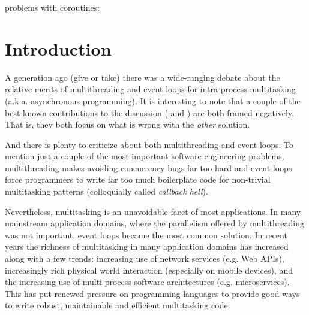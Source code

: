 \documentclass[a4paper,UKenglish,cleveref, autoref]{lipics-v2019}
\begin{document}









problems with coroutines:









\section{Introduction}

A generation ago (give or take) there was a wide-ranging debate about the relative merits of multithreading and event loops for intra-process multitasking (a.k.a. asynchronous programming).
It is interesting to note that a couple of the best-known contributions to the discussion (\cite{Ousterhout1996} and \cite{Behren2003a}) are both framed negatively.
That is, they both focus on what is wrong with the \emph{other} solution.

And there is plenty to criticize about both multithreading and event loops.
To mention just a couple of the most important software engineering problems, multithreading makes avoiding concurrency bugs far too hard \cite{Lu2008} and event loops force programmers to write far too much boilerplate code for non-trivial multitasking patterns \cite{Adya2002} (colloquially called \emph{callback hell}).

Nevertheless, multitasking is an unavoidable facet of most applications.
In many mainstream application domains, where the parallelism offered by multithreading was not important, event loops became the most common solution.
In recent years the richness of multitasking in many application domains has increased along with a few trends: increasing use of network services (e.g. Web APIs), increasingly rich physical world interaction (especially on mobile devices), and the increasing use of multi-process software architectures (e.g. microservices).
This has put renewed pressure on programming languages to provide good ways to write robust, maintainable and efficient multitasking code.
\end{document}
